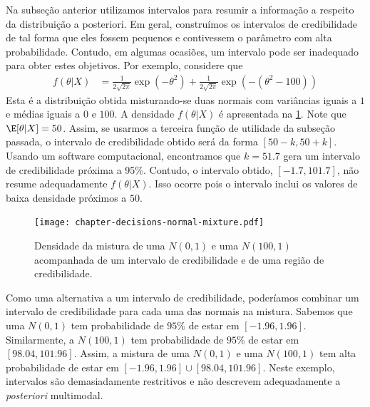 Na subseção anterior utilizamos 
intervalos para resumir a informação a respeito 
da distribuição a posteriori.
Em geral, construímos os intervalos de credibilidade
de tal forma que eles fossem pequenos e 
contivessem o parâmetro com alta probabilidade.
Contudo, em algumas ocasiões, 
um intervalo pode ser inadequado para obter estes objetivos.
Por exemplo, considere que
\begin{align*}
 f(\theta|X)
 &= \frac{1}{2\sqrt{2\pi}}\exp(-\theta^{2})
 +\frac{1}{2\sqrt{2\pi}}\exp(-(\theta^{2}-100))
\end{align*}
Esta é a distribuição obtida misturando-se 
duas normais com  variâncias iguais a $1$ e 
médias iguais a $0$ e $100$.
A densidade $f(\theta|X)$ é apresentada na
\cref{figure:normal-mixture-1}.
Note que $\E[\theta|X] = 50$.
Assim, se usarmos a terceira 
função de utilidade da subseção passada,
o intervalo de credibilidade obtido será
da forma $[50-k,50+k]$.
Usando um software computacional,
encontramos que $k=51.7$ gera 
um intervalo de credibilidade próxima a 95\%.
Contudo, o intervalo obtido, $[-1.7,101.7]$, 
não resume adequadamente $f(\theta|X)$.
Isso ocorre pois o intervalo inclui 
os valores de baixa densidade próximos a $50$.
\begin{figure}
 \centering
 \texttt{[image: chapter-decisions-normal-mixture.pdf]}
 \caption{Densidade da mistura de 
 uma $N(0,1)$ e uma $N(100,1)$
 acompanhada de um intervalo de credibilidade e
 de uma região de credibilidade.}
 \label{figure:normal-mixture-1}
\end{figure}

Como uma alternativa a um 
intervalo de credibilidade,
poderíamos combinar um 
intervalo de credibilidade para cada 
uma das normais na mistura.
Sabemos que uma $N(0,1)$ tem 
probabilidade de $95\%$ de estar em $[-1.96,1.96]$.
Similarmente, a $N(100,1)$ tem 
probabilidade de $95\%$ de estar em $[98.04,101.96]$.
Assim, a mistura de 
uma $N(0,1)$ e uma $N(100,1)$ tem 
alta probabilidade de estar em 
$[-1.96,1.96] \cup [98.04,101.96]$.
Neste exemplo, intervalos são 
demasiadamente restritivos e 
não descrevem adequadamente 
a \emph{posteriori} multimodal.

